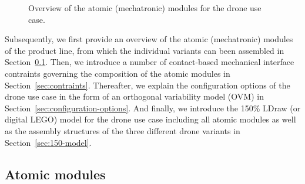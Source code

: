 \documentclass[sigconf,review,anonymous]{acmart}
\begin{document}
\begin{figure}[tbp]
    
    \hfill
    \hfill
    \hfill

    \caption{Overview of the atomic (mechatronic) modules for the drone use case.}
    \label{fig:atomic-modules}
\end{figure}

Subsequently, we first provide an overview of the atomic (mechatronic) modules of the product line, from which the individual variants can been assembled in Section~\ref{sec:atomic-modules}.
Then, we introduce a number of contact-based mechanical interface contraints governing the composition of the atomic modules in Section~\ref{sec:contraints}.
Thereafter, we explain the configuration options of the drone use case in the form of an orthogonal variability model (OVM) in Section~\ref{sec:configuration-options}.
And finally, we introduce the 150\% LDraw (or digital LEGO) model for the drone use case including all atomic modules as well as the assembly structures of the three different drone variants in Section~\ref{sec:150-model}.

\subsection{Atomic modules}
\label{sec:atomic-modules}
\end{document}
